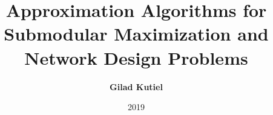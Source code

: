 \title{
Approximation Algorithms 
for
Submodular Maximization 
and 
Network Design Problems}
\author[shortname]{
    \textbf{Gilad Kutiel}
}
\date{2019}


